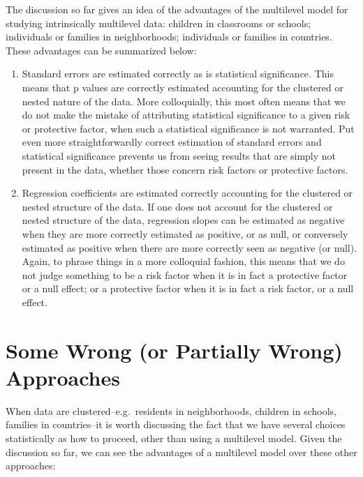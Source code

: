 \documentclass[
  letterpaper,
  DIV=11,
  numbers=noendperiod]{scrreprt}
\providecommand{\tightlist}{%
  \setlength{\itemsep}{0pt}\setlength{\parskip}{0pt}}\usepackage{longtable,booktabs,array}
\begin{document}
The discussion so far gives an idea of the advantages of the multilevel
model for studying intrinsically multilevel data: children in classrooms
or schools; individuals or families in neighborhoods; individuals or
families in countries. These advantages can be summarized below:

\begin{enumerate}
\def\labelenumi{\arabic{enumi}.}
\tightlist
\item
  Standard errors are estimated correctly as is statistical
  significance. This means that p values are correctly estimated
  accounting for the clustered or nested nature of the data. More
  colloquially, this most often means that we do not make the mistake of
  attributing statistical significance to a given risk or protective
  factor, when such a statistical significance is not warranted. Put
  even more straightforwardly correct estimation of standard errors and
  statistical significance prevents us from seeing results that are
  simply not present in the data, whether those concern risk factors or
  protective factors. 
\item
  Regression coefficients are estimated correctly accounting for the
  clustered or nested structure of the data. If one does not account for
  the clustered or nested structure of the data, regression slopes can
  be estimated as negative when they are more correctly estimated as
  positive, or as null, or conversely estimated as positive when there
  are more correctly seen as negative (or null). Again, to phrase things
  in a more colloquial fashion, this means that we do not judge
  something to be a risk factor when it is in fact a protective factor
  or a null effect; or a protective factor when it is in fact a risk
  factor, or a null effect. 
\end{enumerate}

\section{Some Wrong (or Partially Wrong)
Approaches}\label{sec-wrongapproaches}

When data are clustered--e.g.~residents in neighborhoods, children in
schools, families in countries--it is worth discussing the fact that we
have several choices statistically as how to proceed, other than using a
multilevel model. Given the discussion so far, we can see the advantages
of a multilevel model over these other approaches:
\end{document}
